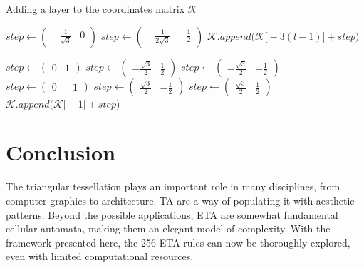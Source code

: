 \documentclass{article}
\begin{document}
\begin{algorithm}[H]
\caption{Adding a layer to the coordinates matrix $\mathcal{K}$}\label{expand-coords}
\begin{algorithmic}[1]
    \State $step \gets \begin{pmatrix}-\frac{1}{\sqrt{3}}&0\end{pmatrix} $
    \Else
    \State $step \gets \begin{pmatrix}-\frac{1}{2\sqrt{3}}&-\frac{1}{2}\end{pmatrix}$
    \EndIf
    \State $\mathcal{K}.append\Big(\mathcal{K}\big[-3(l-1)\big]+step\Big)$
        
            $step \gets \begin{pmatrix}0&1\end{pmatrix}$
            $step \gets \begin{pmatrix}-\frac{\sqrt{3}}{2}&\frac{1}{2}\end{pmatrix}$
            $step \gets \begin{pmatrix}-\frac{\sqrt{3}}{2}&-\frac{1}{2}\end{pmatrix}$
            $step \gets \begin{pmatrix}0&-1\end{pmatrix}$
            $step \gets \begin{pmatrix}\frac{\sqrt{3}}{2}&-\frac{1}{2}\end{pmatrix}$
            $step \gets \begin{pmatrix}\frac{\sqrt{3}}{2}&\frac{1}{2}\end{pmatrix}$
        \EndIf
        \State $\mathcal{K}.append\Big(\mathcal{K}\big[-1\big]+step\Big)$
    \EndFor
\end{algorithmic}
\end{algorithm}

\medskip

\section{Conclusion} \label{conclusion}
The triangular tessellation plays an important role in many disciplines, from computer graphics to architecture. TA are a way of populating it with aesthetic patterns. Beyond the possible applications, ETA are somewhat fundamental cellular automata, making them an elegant model of complexity. With the framework presented here, the 256 ETA rules can now be thoroughly explored, even with limited computational resources. \\
\end{document}
